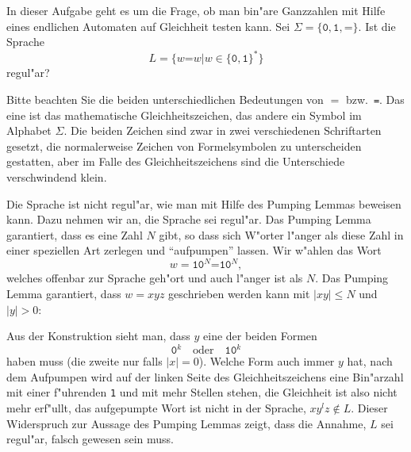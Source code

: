In dieser Aufgabe geht es um die Frage, ob man bin"are Ganzzahlen mit
Hilfe eines endlichen Automaten auf Gleichheit testen kann.
Sei $\Sigma=\{\texttt{0},\texttt{1},\texttt{=}\}$. Ist die Sprache
\[
L=\{ w\texttt{=}w|w\in \{\texttt{0},\texttt{1}\}^*\}
\]
regul"ar?

\begin{hinweis}
Bitte beachten Sie die beiden unterschiedlichen Bedeutungen von $=$
bzw.~\texttt{=}.
Das eine ist das mathematische Gleichheitszeichen, das andere ein Symbol
im Alphabet $\Sigma$.
Die beiden Zeichen sind zwar in zwei verschiedenen Schriftarten gesetzt,
die normalerweise Zeichen von Formelsymbolen zu unterscheiden gestatten,
aber im Falle des Gleichheitszeichens sind die Unterschiede verschwindend
klein.
\end{hinweis}

\begin{loesung}
Die Sprache ist nicht regul"ar, wie man mit Hilfe des Pumping
Lemmas beweisen kann. Dazu nehmen wir an, die Sprache sei regul"ar.
Das Pumping Lemma garantiert, dass es eine Zahl $N$ gibt, so dass
sich W"orter l"anger als diese Zahl in einer speziellen Art
zerlegen und ``aufpumpen'' lassen. Wir w"ahlen das Wort
\[
w=\texttt{10}^N\texttt{=10}^N,
\]
welches offenbar zur Sprache geh"ort und auch l"anger ist als $N$.
Das Pumping Lemma garantiert, dass $w=xyz$  geschrieben werden kann
mit $|xy|\le N$ und $|y|>0$:
\begin{center}
\end{center}
Aus der Konstruktion sieht man, dass $y$ eine der beiden Formen
\[
\texttt{0}^k
\quad\text{oder}\quad
\texttt{10}^k
\]
haben muss (die zweite nur falls $|x|=0$).
Welche Form auch immer $y$ hat, nach dem Aufpumpen wird
auf der linken Seite des Gleichheitszeichens eine Bin"arzahl mit
einer f"uhrenden \texttt{1} und mit mehr Stellen stehen, die Gleichheit
ist also nicht mehr erf"ullt, das aufgepumpte Wort ist nicht in der
Sprache, $xy^lz\not\in L$. Dieser Widerspruch zur Aussage des Pumping
Lemmas zeigt, dass die Annahme, $L$ sei regul"ar, falsch gewesen
sein muss.
\end{loesung}


